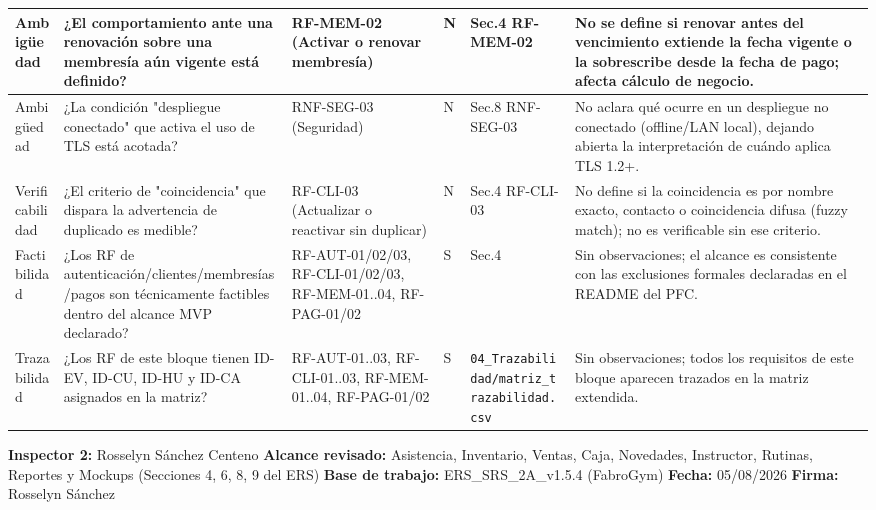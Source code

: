 \documentclass[11pt,a4paper]{article}
\begin{document}
\begin{landscape}
\begin{longtable}{|L{2.4cm}|L{4.6cm}|L{4.0cm}|C{1.3cm}|L{4.2cm}|L{6.5cm}|}
Ambigüedad & ¿El comportamiento ante una renovación sobre una membresía aún vigente está definido? & RF-MEM-02 (Activar o renovar membresía) & N & Sec.4 RF-MEM-02 & No se define si renovar antes del vencimiento extiende la fecha vigente o la sobrescribe desde la fecha de pago; afecta cálculo de negocio. \\ \hline
Ambigüedad & ¿La condición "despliegue conectado" que activa el uso de TLS está acotada? & RNF-SEG-03 (Seguridad) & N & Sec.8 RNF-SEG-03 & No aclara qué ocurre en un despliegue no conectado (offline/LAN local), dejando abierta la interpretación de cuándo aplica TLS 1.2+. \\ \hline
Verificabilidad & ¿El criterio de "coincidencia" que dispara la advertencia de duplicado es medible? & RF-CLI-03 (Actualizar o reactivar sin duplicar) & N & Sec.4 RF-CLI-03 & No define si la coincidencia es por nombre exacto, contacto o coincidencia difusa (fuzzy match); no es verificable sin ese criterio. \\ \hline
Factibilidad & ¿Los RF de autenticación/clientes/membresías/pagos son técnicamente factibles dentro del alcance MVP declarado? & RF-AUT-01/02/03, RF-CLI-01/02/03, RF-MEM-01..04, RF-PAG-01/02 & S & Sec.4 & Sin observaciones; el alcance es consistente con las exclusiones formales declaradas en el README del PFC. \\ \hline
Trazabilidad & ¿Los RF de este bloque tienen ID-EV, ID-CU, ID-HU y ID-CA asignados en la matriz? & RF-AUT-01..03, RF-CLI-01..03, RF-MEM-01..04, RF-PAG-01/02 & S & \nolinkurl{04_Trazabilidad/matriz_trazabilidad.csv} & Sin observaciones; todos los requisitos de este bloque aparecen trazados en la matriz extendida. \\ \hline
\end{longtable}
\normalsize
\end{landscape}

\bigskip

\textbf{Inspector 2:} Rosselyn Sánchez Centeno \quad
\textbf{Alcance revisado:} Asistencia, Inventario, Ventas, Caja, Novedades, Instructor, Rutinas, Reportes y Mockups (Secciones 4, 6, 8, 9 del ERS) \quad
\textbf{Base de trabajo:} ERS\_SRS\_2A\_v1.5.4 (FabroGym) \quad
\textbf{Fecha:} 05/08/2026 \quad \textbf{Firma:} Rosselyn Sánchez
\end{document}
